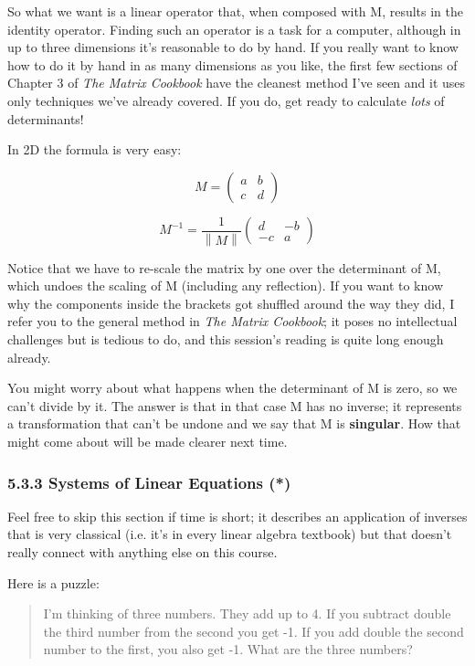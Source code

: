 \documentclass[oneside,english]{amsbook}
\numberwithin{section}{chapter}
\theoremstyle{plain}
\theoremstyle{definition}
\begin{document}
So what we want is a linear operator that, when composed with M, results
in the identity operator. Finding such an operator is a task for a
computer, although in up to three dimensions it's reasonable to do by
hand. If you really want to know how to do it by hand in as many
dimensions as you like, the first few sections of Chapter 3 of \emph{The
	Matrix Cookbook} have the cleanest method I've seen and it uses only
techniques we've already covered. If you do, get ready to calculate
\emph{lots} of determinants!

In 2D the formula is very easy:

\[M = \begin{pmatrix}
	a & b \\
	c & d
\end{pmatrix}\]

\[M^{- 1} = \frac{1}{\left\| M \right\|}\begin{pmatrix}
	d & - b \\
	- c & a
\end{pmatrix}\]

Notice that we have to re-scale the matrix by one over the determinant
of M, which undoes the scaling of M (including any reflection). If you
want to know why the components inside the brackets got shuffled around
the way they did, I refer you to the general method in \emph{The Matrix
	Cookbook}; it poses no intellectual challenges but is tedious to do, and
this session's reading is quite long enough already.

You might worry about what happens when the determinant of M is zero, so
we can't divide by it. The answer is that in that case M has no inverse;
it represents a transformation that can't be undone and we say that M is
\textbf{singular}. How that might come about will be made clearer next
time.

\subsubsection{5.3.3 Systems of Linear Equations
	(*)}\label{systems-of-linear-equations}

Feel free to skip this section if time is short; it describes an
application of inverses that is very classical (i.e. it's in every
linear algebra textbook) but that doesn't really connect with anything
else on this course.

Here is a puzzle:

\begin{quote}
	I'm thinking of three numbers. They add up to 4. If you subtract double
	the third number from the second you get -1. If you add double the
	second number to the first, you also get -1. What are the three numbers?
\end{quote}
\end{document}
